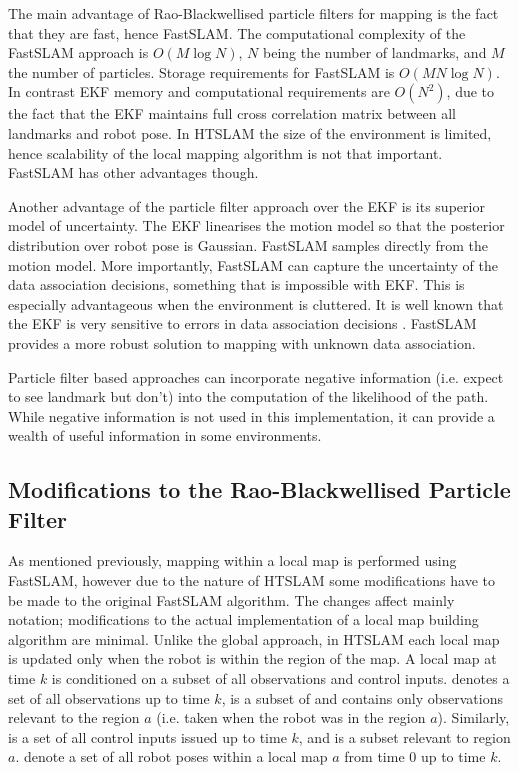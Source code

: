 The main advantage of Rao-Blackwellised particle filters for mapping
is the fact that they are fast, hence FastSLAM. The computational
complexity of the FastSLAM approach is $O(M \log N)$, $N$ being the
number of landmarks, and $M$ the number of particles. Storage
requirements for FastSLAM is $O(M N \log N)$. In contrast EKF memory
and computational requirements are $O(N^2)$, due to the fact that the
EKF maintains full cross correlation matrix between all landmarks and
robot pose. In HTSLAM the size of the environment is limited, hence
scalability of the local mapping algorithm is not that
important. FastSLAM has other advantages though.

Another advantage of the particle filter approach over the EKF is its
superior model of uncertainty. The EKF linearises the motion model so
that the posterior distribution over robot pose is Gaussian. FastSLAM
samples directly from the motion model. More importantly, FastSLAM can
capture the uncertainty of the data association decisions, something
that is impossible with EKF.  This is especially advantageous when the
environment is cluttered. It is well known that the EKF is very
sensitive to errors in data association decisions
\cite{neira01:_data_assoc_stoch_mappin_using}.  FastSLAM provides a
more robust solution to mapping with unknown data association.

Particle filter based approaches can incorporate negative information
(i.e. expect to see landmark but don't) into the computation of the
likelihood of the path. While negative information is not used in this
implementation, it can provide a wealth of useful information in some
environments.


\subsection{Modifications to the Rao-Blackwellised Particle Filter}


As mentioned previously, mapping within a local map is performed using
FastSLAM, however due to the nature of HTSLAM some modifications have
to be made to the original FastSLAM algorithm. The changes affect
mainly notation; modifications to the actual implementation of a local
map building algorithm are minimal.  Unlike the global approach, in
HTSLAM each local map is updated only when the robot is within the
region of the map. A local map at time $k$ is conditioned on a subset
of all observations and control inputs.  denotes a set of
all observations up to time $k$,  is a subset of 
and contains only observations relevant to the region $a$ (i.e. taken
when the robot was in the region $a$). Similarly,  is a set
of all control inputs issued up to time $k$, and  is a
subset relevant to region $a$.  denote a set of all robot
poses within a local map $a$ from time $0$ up to time $k$.

